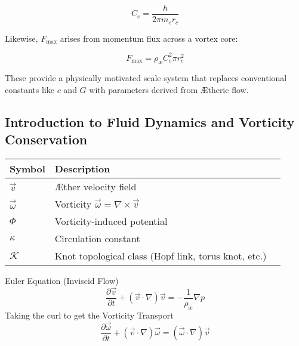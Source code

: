 \documentclass[aps,preprint,superscriptaddress]{revtex4}
\begin{document}
    \[
        C_e = \frac{h}{2\pi m_e r_c}
    \]

    Likewise, $F_{\max}$ arises from momentum flux across a vortex core:

    \[
        F_{\max} = \rho_{\text{\ae}} C_e^2 \pi r_c^2
    \]

    These provide a physically motivated scale system that replaces conventional constants like $c$ and $G$ with parameters derived from Ætheric flow.


    \subsection*{Introduction to Fluid Dynamics and Vorticity Conservation}

    \begin{table}[h!]
        \centering
        \begin{tabular}{llc}
            \hline
            Symbol & Description \\
            \hline
            \midrule
            \(\vec{v}\) & Æther velocity field \\
            \(\vec{\omega}\) &  Vorticity \(\vec{\omega} = \nabla \times \vec{v}\) \\
            \(\Phi\) & Vorticity-induced potential \\
            \(\kappa\) & Circulation constant \\
            \(\mathcal{K}\) & Knot topological class (Hopf link, torus knot, etc.) \\
            \bottomrule
            \hline
        \end{tabular}\label{tab:table2}
    \end{table}

    Euler Equation (Inviscid Flow)
    \begin{equation}
        \frac{\partial \vec{v}}{\partial t} + (\vec{v} \cdot \nabla)\vec{v} = -\frac{1}{\rho_\text{æ}} \nabla p\label{eq:Euler-Equation}
    \end{equation}
    Taking the curl to get the Vorticity Transport
    \begin{equation}
        \frac{\partial \vec{\omega}}{\partial t} + (\vec{v} \cdot \nabla)\vec{\omega} = (\vec{\omega} \cdot \nabla) \vec{v}\label{eq:Vorticity-Transport}
    \end{equation}
\end{document}
